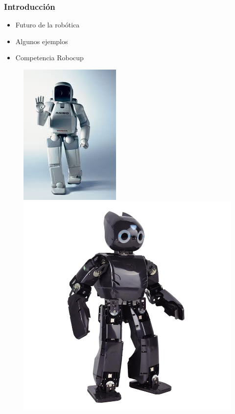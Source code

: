 \documentclass{beamer}
\begin{document}
\begin{frame}
  \frametitle{Introducci\'{o}n}
  \begin{block}{}
  \begin{itemize}
    \item Futuro de la rob\'otica 
    \item Algunos ejemplos
    \item Competencia Robocup
  \end{itemize}
  \end{block}

\begin{figure}

\includegraphics[scale=0.3]{asimo.jpg} 
\includegraphics[scale=0.1]{Darwin_OP.jpg} 

\end{figure}
\end{frame}
\end{document}
